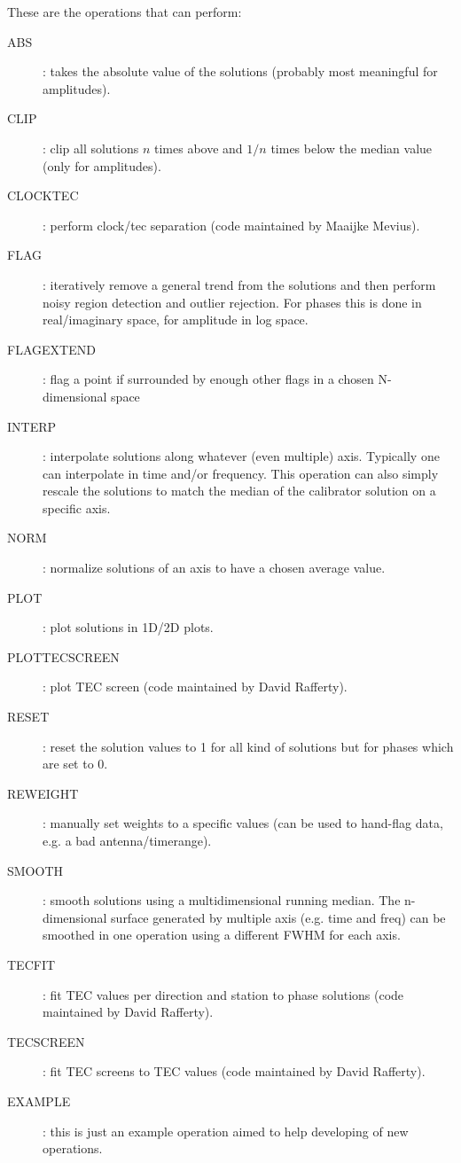 These are the operations that \losoto{} can perform:
\begin{description}
 \item[ABS]: takes the absolute value of the solutions (probably most meaningful for amplitudes).
 \item[CLIP]: clip all solutions $n$ times above and $1/n$ times below the median value (only for amplitudes).
 \item[CLOCKTEC]: perform clock/tec separation (code maintained by Maaijke Mevius).
 \item[FLAG]: iteratively remove a general trend from the solutions and then perform noisy region detection and outlier rejection. For phases this is done in real/imaginary space, for amplitude in log space.
 \item[FLAGEXTEND]: flag a point if surrounded by enough other flags in a chosen N-dimensional space
 \item[INTERP]: interpolate solutions along whatever (even multiple) axis. Typically one can interpolate in time and/or frequency. This operation can also simply rescale the solutions to match the median of the calibrator solution on a specific axis.
 \item[NORM]: normalize solutions of an axis to have a chosen average value.
 \item[PLOT]: plot solutions in 1D/2D plots.
 \item[PLOTTECSCREEN]: plot TEC screen (code maintained by David Rafferty).
 \item[RESET]: reset the solution values to 1 for all kind of solutions but for phases which are set to 0.
 \item[REWEIGHT]: manually set weights to a specific values (can be used to hand-flag data, e.g. a bad antenna/timerange).
 \item[SMOOTH]: smooth solutions using a multidimensional running median. The n-dimensional surface generated by multiple axis (e.g. time and freq) can be smoothed in one operation using a different FWHM for each axis.
 \item[TECFIT]: fit TEC values per direction and station to phase solutions (code maintained by David Rafferty).
 \item[TECSCREEN]: fit TEC screens to TEC values (code maintained by David Rafferty).
 \item[EXAMPLE]: this is just an example operation aimed to help developing of new operations.
\end{description}

